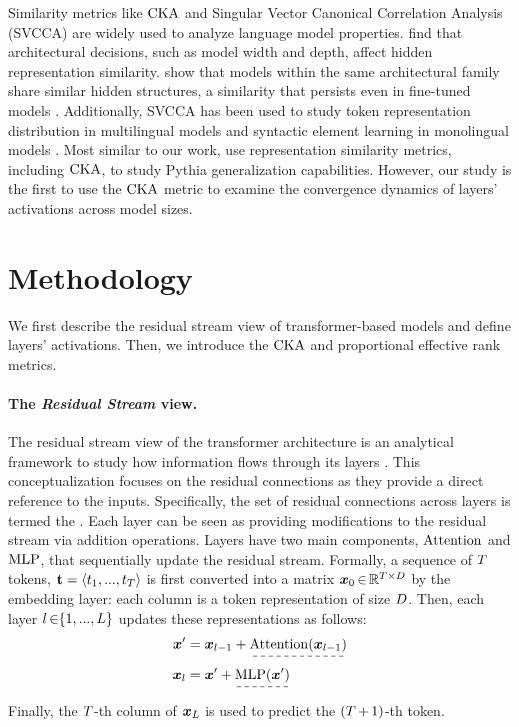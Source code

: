 Similarity metrics like $\mathrm{CKA}$ and Singular Vector Canonical Correlation Analysis (SVCCA) are widely used to analyze language model properties. \citet{nguyen2020wide} find that architectural decisions, such as model width and depth, affect hidden representation similarity. \citet{wu2020similarity} show that models within the same architectural family share similar hidden structures, a similarity that persists even in fine-tuned models \citep{phang2021finetuned}. Additionally, SVCCA has been used to study token representation distribution in multilingual models \citep{singh2019bert} and syntactic element learning in monolingual models \citep{saphra2019understanding}.
Most similar to our work, \citet{brown2023understanding} use representation similarity metrics, including $\mathrm{CKA}$, to study Pythia generalization capabilities. However, our study is the first to use the $\mathrm{CKA}$ metric to examine the convergence dynamics of layers' activations across model sizes.


\section{Methodology}\label{sec:methodology}

We first describe the residual stream view of transformer-based models and define layers' activations. Then, we introduce the $\mathrm{CKA}$ and proportional effective rank metrics.

\paragraph{The \textit{Residual Stream} view.}
The residual stream view of the transformer architecture \citep{vaswani2017attention} is an analytical framework to study how information flows through its layers \citep{elhage2021mathematical}. 
This conceptualization focuses on the residual connections as they provide a direct reference to the inputs. Specifically, the set of residual connections across layers is termed the . Each layer can be seen as providing modifications to the residual stream via addition operations.
Layers have two main components, $\mathrm{Attention}$ and $\mathrm{MLP}$, that sequentially update the residual stream. Formally, a sequence of $T$ tokens, $\boldsymbol{\mathrm{t}} = \langle t_1, ..., t_T\rangle$ is first converted into a matrix $\boldsymbol{x}_0 \mathop{\in} \mathbb{R}^{\mathop{T\times D}}$ by the embedding layer: each column is a token representation of size $D$. Then, each layer $l\mathop{\in}\{1,..., L\}$ updates these representations as follows:
\begin{align}\label{eq:residual_stream}
    \xdata' &= \xdata_{\layer-1}  + \dashuline{\attention(\xdata_{\layer-1})} \\
    \xdata_\layer &= \xdata' + \dashuline{\mlp(\xdata')}
\end{align}
Finally, the $T$-th column of $\boldsymbol{x}_L$ is used to predict the $(T\mathop{+}1)$-th token. 

